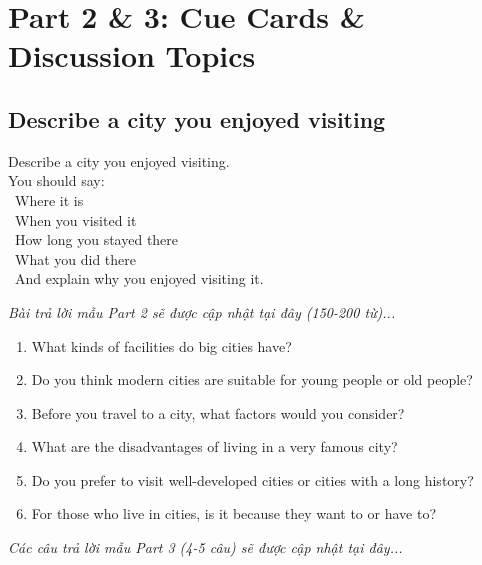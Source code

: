 \chapter{Part 2 \& 3: Cue Cards \& Discussion Topics}

\section{Describe a city you enjoyed visiting}
\begin{ieltsprompt}
Describe a city you enjoyed visiting. \\
You should say: \\
\textbullet\ Where it is \\
\textbullet\ When you visited it \\
\textbullet\ How long you stayed there \\
\textbullet\ What you did there \\
\textbullet\ And explain why you enjoyed visiting it. \\
\end{ieltsprompt}

\vspace{1em}
\textit{Bài trả lời mẫu Part 2 sẽ được cập nhật tại đây (150-200 từ)...}
\vspace{2em}

\begin{ieltsprompt}
\begin{enumerate}[itemsep=4pt]
    \item What kinds of facilities do big cities have?
    \item Do you think modern cities are suitable for young people or old people?
    \item Before you travel to a city, what factors would you consider?
    \item What are the disadvantages of living in a very famous city?
    \item Do you prefer to visit well-developed cities or cities with a long history?
    \item For those who live in cities, is it because they want to or have to?
\end{enumerate}
\end{ieltsprompt}

\vspace{1em}
\textit{Các câu trả lời mẫu Part 3 (4-5 câu) sẽ được cập nhật tại đây...}
\vspace{2em}

